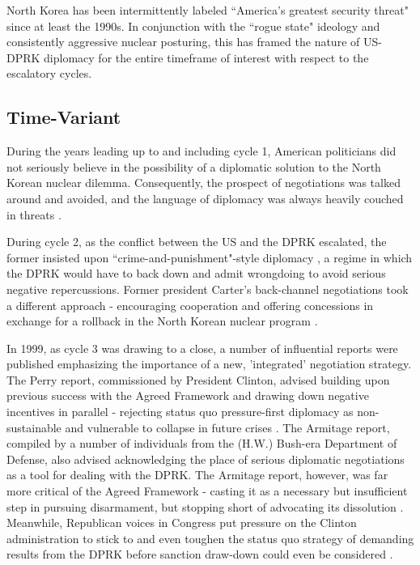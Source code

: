 North Korea has been intermittently labeled ``America's greatest security threat"\cite{cumings} since at least the 1990s. In conjunction with the ``rogue state" ideology and consistently aggressive nuclear posturing, this has framed the nature of US-DPRK diplomacy for the entire timeframe of interest with respect to the escalatory cycles.

\subsection{Time-Variant}

During the years leading up to and including cycle 1, American politicians did not seriously believe in the possibility of a diplomatic solution to the North Korean nuclear dilemma. Consequently, the prospect of negotiations was talked around and avoided, and the language of diplomacy was always heavily couched in threats \cite{sigal}.

During cycle 2, as the conflict between the US and the DPRK escalated, the former insisted upon ``crime-and-punishment"-style diplomacy \cite{bleiker}, a regime in which the DPRK would have to back down and admit wrongdoing to avoid serious negative repercussions. Former president Carter's back-channel negotiations took a different approach - encouraging cooperation and offering concessions in exchange for a rollback in the North Korean nuclear program \cite{sigal}.

In 1999, as cycle 3 was drawing to a close, a number of influential reports were published emphasizing the importance of a new, 'integrated' negotiation strategy. The Perry report, commissioned by President Clinton, advised building upon previous success with the Agreed Framework and drawing down negative incentives in parallel - rejecting status quo pressure-first diplomacy as non-sustainable and vulnerable to collapse in future crises \cite{perry}. The Armitage report, compiled by a number of individuals from the (H.W.) Bush-era Department of Defense, also advised acknowledging the place of serious diplomatic negotiations as a tool for dealing with the DPRK. The Armitage report, however, was far more critical of the Agreed Framework - casting it as a necessary but insufficient step in pursuing disarmament, but stopping short of advocating its dissolution \cite{armitage}. Meanwhile, Republican voices in Congress put pressure on the Clinton administration to stick to and even toughen the status quo strategy of demanding results from the DPRK before sanction draw-down could even be considered \cite{harnisch}. 

